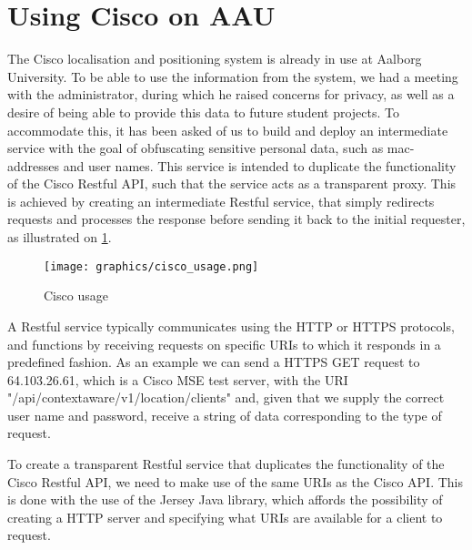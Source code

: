 \section{Using Cisco on AAU}
The Cisco localisation and positioning system is already in use at Aalborg University. To be able to use the information from the system, we had a meeting with the administrator, during which he raised concerns for privacy, as well as a desire of being able to provide this data to future student projects. To accommodate this, it has been asked of us to build and deploy an intermediate service with the goal of obfuscating sensitive personal data, such as mac-addresses and user names. This service is intended to duplicate the functionality of the Cisco Restful API, such that the service acts as a transparent proxy. This is achieved by creating an intermediate Restful service, that simply redirects requests and processes the response before sending it back to the initial requester, as illustrated on \cref{fig:cisco_usage}.

\begin{figure}[h]
	\begin{center}
	\texttt{[image: graphics/cisco\_usage.png]}
	\caption{Cisco usage}
	\label{fig:cisco_usage}
	\end{center} 
\end{figure}

A Restful service typically communicates using the HTTP or HTTPS protocols, and functions by receiving requests on specific URIs to which it responds in a predefined fashion. As an example we can send a HTTPS GET request to 64.103.26.61, which is a Cisco MSE test server, with the URI "/api/contextaware/v1/location/clients" and, given that we supply the correct user name and password, receive a string of data corresponding to the type of request. 

To create a transparent Restful service that duplicates the functionality of the Cisco Restful API, we need to make use of the same URIs as the Cisco API\cite{cisco_mse_api}. This is done with the use of the Jersey Java library, which affords the possibility of creating a HTTP server and specifying what URIs are available for a client to request.


